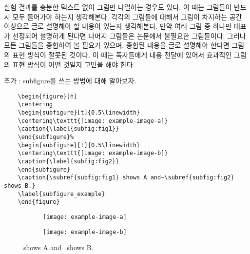\documentclass{gshs_thesis}
\begin{document}
실험 결과를 충분한 텍스트 없이 그림만 나열하는 경우도 있다. 이 때는 그림들이 반드시 모두 들어가야 하는지 생각해본다. 각각의 그림들에 대해서 그림이 차지하는 공간 이상으로 글로 설명해야 할 내용이 있는지 생각해본다. 만약 여러 그림 중 하나만 대표가 선정되어 설명하게 된다면 나머지 그림들은 논문에서 불필요한 그림들이다. 그러나 모든 그림들을 종합하여 볼 필요가 있으며, 종합된 내용을 글로 설명해야 한다면 그림의 표현 방식이 잘못된 것이다. 이 때는 독자들에게 내용 전달에 있어서 효과적인 그림의 표현 방식이 어떤 것일지 고민을 해야 한다.

추가 : subfigure를 쓰는 방법에 대해 알아보자.

\begin{lstlisting}
	\begin{figure}[h]
	\centering
	\begin{subfigure}[t]{0.5\linewidth}
	\centering\texttt{[image: example-image-a]}
	\caption{\label{subfig:fig1}}
	\end{subfigure}%
	\begin{subfigure}[t]{0.5\linewidth}
	\centering\texttt{[image: example-image-b]}
	\caption{\label{subfig:fig2}}
	\end{subfigure}
	\caption{\subref{subfig:fig1} shows A and~\subref{subfig:fig2} shows B.}
	\label{subfigure_example}
	\end{figure}
\end{lstlisting}
\begin{figure}[h]
	\centering
	\begin{subfigure}[t]{0.5\linewidth}
		\centering\texttt{[image: example-image-a]}
		\caption{\label{subfig:fig1}}
	\end{subfigure}%
	\begin{subfigure}[t]{0.5\linewidth}
		\centering\texttt{[image: example-image-b]}
		\caption{\label{subfig:fig2}}
	\end{subfigure}
	\caption{ shows A and~ shows B.}
	\label{subfigure_example}
\end{figure}
\end{document}
